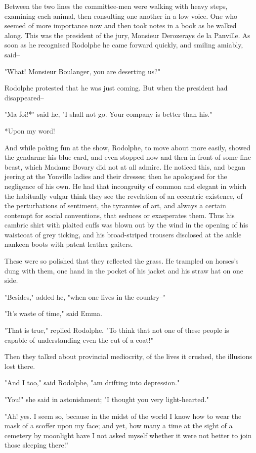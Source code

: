 \documentclass{tufte-book}
\begin{document}
Between the two lines the committee-men were walking with heavy steps,
examining each animal, then consulting one another in a low voice. One
who seemed of more importance now and then took notes in a book as he
walked along. This was the president of the jury, Monsieur Derozerays de
la Panville. As soon as he recognised Rodolphe he came forward quickly,
and smiling amiably, said--

"What! Monsieur Boulanger, you are deserting us?"

Rodolphe protested that he was just coming. But when the president had
disappeared--

"Ma foi!*" said he, "I shall not go. Your company is better than his."

     *Upon my word!

And while poking fun at the show, Rodolphe, to move about more easily,
showed the gendarme his blue card, and even stopped now and then in
front of some fine beast, which Madame Bovary did not at all admire.
He noticed this, and began jeering at the Yonville ladies and their
dresses; then he apologised for the negligence of his own. He had that
incongruity of common and elegant in which the habitually vulgar think
they see the revelation of an eccentric existence, of the perturbations
of sentiment, the tyrannies of art, and always a certain contempt for
social conventions, that seduces or exasperates them. Thus his cambric
shirt with plaited cuffs was blown out by the wind in the opening of his
waistcoat of grey ticking, and his broad-striped trousers disclosed at
the ankle nankeen boots with patent leather gaiters.

These were so polished that they reflected the grass. He trampled on
horses's dung with them, one hand in the pocket of his jacket and his
straw hat on one side.

"Besides," added he, "when one lives in the country--"

"It's waste of time," said Emma.

"That is true," replied Rodolphe. "To think that not one of these people
is capable of understanding even the cut of a coat!"

Then they talked about provincial mediocrity, of the lives it crushed,
the illusions lost there.

"And I too," said Rodolphe, "am drifting into depression."

"You!" she said in astonishment; "I thought you very light-hearted."

"Ah! yes. I seem so, because in the midst of the world I know how to
wear the mask of a scoffer upon my face; and yet, how many a time at the
sight of a cemetery by moonlight have I not asked myself whether it were
not better to join those sleeping there!"
\end{document}
